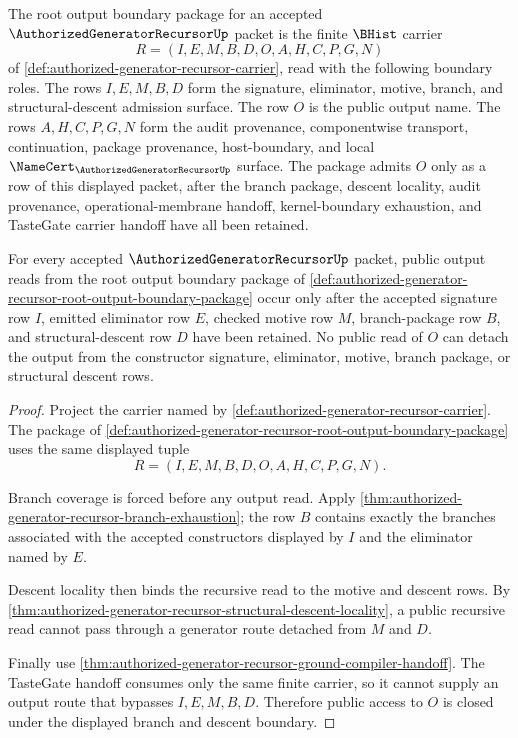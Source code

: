 \begin{definition}
\label{def:authorized-generator-recursor-root-output-boundary-package}
The root output boundary package for an accepted $\AuthorizedGeneratorRecursorUp$ packet is the finite $\BHist$ carrier
$$
R=(I,E,M,B,D,O,A,H,C,P,G,N)
$$
of \autoref{def:authorized-generator-recursor-carrier}, read with the following boundary roles. The rows $I,E,M,B,D$ form the signature, eliminator, motive, branch, and structural-descent admission surface. The row $O$ is the public output name. The rows $A,H,C,P,G,N$ form the audit provenance, componentwise transport, continuation, package provenance, host-boundary, and local $\NameCert_{\AuthorizedGeneratorRecursorUp}$ surface. The package admits $O$ only as a row of this displayed packet, after the branch package, descent locality, audit provenance, operational-membrane handoff, kernel-boundary exhaustion, and TasteGate carrier handoff have all been retained.
\end{definition}

\begin{theorem}
\label{thm:authorized-generator-recursor-root-branch-output-closed-boundary}
For every accepted $\AuthorizedGeneratorRecursorUp$ packet, public output reads from the root output boundary package of \autoref{def:authorized-generator-recursor-root-output-boundary-package} occur only after the accepted signature row $I$, emitted eliminator row $E$, checked motive row $M$, branch-package row $B$, and structural-descent row $D$ have been retained. No public read of $O$ can detach the output from the constructor signature, eliminator, motive, branch package, or structural descent rows.
\end{theorem}
\begin{proof}
Project the carrier named by \autoref{def:authorized-generator-recursor-carrier}. The package of \autoref{def:authorized-generator-recursor-root-output-boundary-package} uses the same displayed tuple
$$
R=(I,E,M,B,D,O,A,H,C,P,G,N).
$$

Branch coverage is forced before any output read. Apply \autoref{thm:authorized-generator-recursor-branch-exhaustion}; the row $B$ contains exactly the branches associated with the accepted constructors displayed by $I$ and the eliminator named by $E$.

Descent locality then binds the recursive read to the motive and descent rows. By \autoref{thm:authorized-generator-recursor-structural-descent-locality}, a public recursive read cannot pass through a generator route detached from $M$ and $D$.

Finally use \autoref{thm:authorized-generator-recursor-ground-compiler-handoff}. The TasteGate handoff consumes only the same finite carrier, so it cannot supply an output route that bypasses $I,E,M,B,D$. Therefore public access to $O$ is closed under the displayed branch and descent boundary.
\end{proof}

